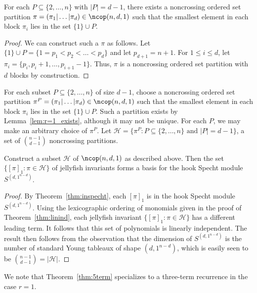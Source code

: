 \begin{lemma}\label{lem:r=1_exists}
For each $P\subseteq \{2,\ldots,n\}$ with $|P| = d-1$, there exists a noncrossing ordered set partition $\pi = (\pi_1| \dots | \pi_d) \in \ncop(n,d,1)$ such that the smallest element in each block $\pi_i$ lies in the set $\{1\}\cup P$.
\end{lemma}
\begin{proof}
We can construct such a $\pi$ as follows. Let $\{1\}\cup P = \{1 = p_1 < p_2 < \dots < p_d \}$ and let $p_{d+1} = n+1$. For $1 \leq i \leq d$, let $\pi_i = \{p_{i}, p_i + 1, \dots, p_{i+1} - 1 \}$. Thus, $\pi$ is a noncrossing ordered set partition with $d$ blocks by construction.
\end{proof}

For each subset $P \subseteq \{2,\ldots,n\}$ of size $d-1$, choose a noncrossing ordered set partition $\pi^P = (\pi_1 | \dots | \pi_d) \in \ncop(n,d,1)$ such that the smallest element in each block $\pi_i$ lies in the set $\{1\}\cup P$. Such a partition exists by Lemma~\ref{lem:r=1_exists}, although it may not be unique. For each $P$, we may make an arbitrary choice of $\pi^P$. Let $\mathcal{H}  = \{\pi^P : P \subseteq \{2,\ldots,n\} \text{ and } |P| = d-1 \}$, a set of $\binom{n-1}{d-1}$ noncrossing partitions.

\begin{theorem}\label{theorem:requals1}
Construct a subset $\mathcal{H}$ of $\ncop(n,d,1)$ as described above. Then the set $\{[\pi]_1 : \pi \in \mathcal{H}\}$ of jellyfish invariants forms a basis for the hook Specht module $S^{(d,1^{n-d})}$. 
\end{theorem}
\begin{proof}
By Theorem~\ref{thm:inspecht}, each $[\pi]_1$ is in the hook Specht module $S^{(d,1^{n-d})}$. Using the lexicographic ordering of monomials given in the proof of Theorem~\ref{thm:linind}, each jellyfish invariant $\{[\pi]_1 : \pi\in\mathcal{H}\}$ has a different leading term. It follows that this set of polynomials is linearly independent. The result then follows from the observation that the dimension of $S^{(d,1^{n-d})}$ is the number of standard Young tableaux of shape $(d,1^{n-d})$, which is easily seen to be $\binom{n-1}{d-1}=|\mathcal{H}|$.
\end{proof}

We note that Theorem~\ref{thm:5term} specializes to a three-term recurrence in the case $r=1$. 

